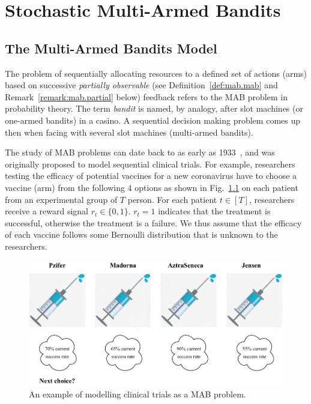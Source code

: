 \chapter{Stochastic Multi-Armed Bandits}\label{chap:mab}
	\minitoc
	\newpage


\section{The Multi-Armed Bandits Model}\label{sec:mab.model}

The problem of sequentially allocating resources to a defined set of actions (arms) based on successive \emph{partially observable} (see Definition~\ref{def:mab.mab} and Remark~\ref{remark:mab.partial} below) feedback refers to the MAB problem in probability theory. The term \emph{bandit} is named, by analogy, after slot machines (or one-armed bandits) in a casino. A sequential decision making problem comes up then when facing with several slot machines (multi-armed bandits).

The study of MAB problems can date back to as early as 1933~\citep{thompson1933}, and was originally proposed to model sequential clinical trials. For example, researchers testing the efficacy of potential vaccines for a new coronavirus have to choose a vaccine (arm) from the following 4 options as shown in Fig.~\ref{fig:mab.covid} on each patient from an experimental group of $T$ person. For each patient $t\in[T]$, researchers receive a reward signal $r_t\in\{0,1\}$. $r_t=1$ indicates that the treatment is successful, otherwise the treatment is a failure. We thus assume that the efficacy of each vaccine follows some Bernoulli distribution that is unknown to the researchers.

\begin{figure}[ht]
    \centering
    \includegraphics[width=\textwidth]{Chapter2/img/covid.pdf}
    \caption{An example of modelling clinical trials as a MAB problem.}
    \label{fig:mab.covid}
\end{figure}


